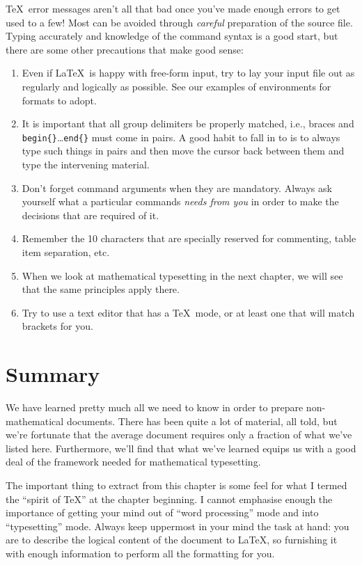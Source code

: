\TeX\ error messages aren't all that bad once you've made
enough errors to get used to a few!  Most can be avoided
through {\em careful\/} preparation of the source file.
Typing accurately and knowledge of the command syntax is a good start,
but there are some other precautions that make good sense:
\begin{enumerate}
\item Even if \LaTeX\ is happy with free-form input, try to
	 lay your input file out as regularly and logically as 
	 possible.  See our examples of environments for
	 formats to adopt.
\item It is important that all group delimiters be properly matched,
	 i.e., braces and {\tt\bs begin\{\}}\ldots{\tt\bs end\{\}} must
	 come in pairs.  A good habit to fall in to is to always type
	 such things in pairs and then move the cursor back between
	 them and type the intervening material.
\item Don't forget command arguments when they are mandatory.
	 Always ask yourself what a particular commands {\em needs
	 from you\/} in order to make the decisions that are required of it.
\item Remember the 10 characters that are specially reserved for
	 commenting, table item separation, etc.
\item When we look at mathematical typesetting in the next chapter,
	 we will see that the same principles apply there.
\item Try to use a text editor that has a \TeX\ mode, or at least
	 one that will match brackets for you.      
\end{enumerate}

\section{Summary}
We have learned pretty much all we need to know in order to 
prepare non-mathematical documents.  There has been quite
a lot of material, all told, but we're fortunate that the
average document requires only a fraction of what we've
listed here.  Furthermore, we'll find that what we've
learned equips us with a good deal of the framework
needed for mathematical typesetting.

The important thing to extract from this chapter is some
feel for what I termed the ``spirit of \TeX'' at the
chapter beginning.  I cannot emphasise enough the
importance of getting your mind out of ``word processing''
mode and into ``typesetting'' mode.  Always keep uppermost
in your mind the task at hand:  you are to describe the
logical content of the document to \LaTeX, so furnishing
it with enough information to perform all the formatting
for you.

